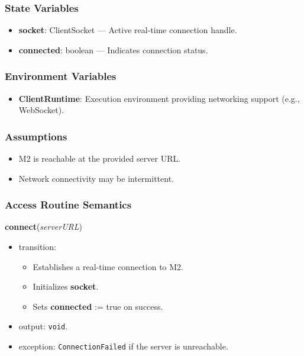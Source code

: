 \documentclass[12pt, titlepage]{article}
\begin{document}
\subsubsection{State Variables}
\begin{itemize}
    \item \textbf{socket}: ClientSocket --- Active real-time connection handle.
    \item \textbf{connected}: boolean --- Indicates connection status.
\end{itemize}

\subsubsection{Environment Variables}
\begin{itemize}
    \item \textbf{ClientRuntime}: Execution environment providing networking support (e.g., WebSocket).
\end{itemize}

\subsubsection{Assumptions}
\begin{itemize}
    \item M2 is reachable at the provided server URL.
    \item Network connectivity may be intermittent.
\end{itemize}

\subsubsection{Access Routine Semantics}

\noindent\textbf{connect}(\textit{serverURL})
\begin{itemize}
    \item transition:
    \begin{itemize}
        \item Establishes a real-time connection to M2.
        \item Initializes \textbf{socket}.
        \item Sets \textbf{connected} := true on success.
    \end{itemize}
    \item output: \texttt{void}.
    \item exception: \texttt{ConnectionFailed} if the server is unreachable.
\end{itemize}
\end{document}
